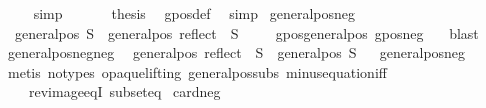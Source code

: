 \begin{isabellebody}
\ {}\ {}\ \isamarkupfalse%
\ simp\isanewline
\ \ \isakeywordONE{{\isacharbraceright}{\kern0pt}}\isamarkupfalse%
\isanewline
\ \ \isamarkupfalse%
\ {\isacharquery}{\kern0pt}thesis\ \isamarkupfalse%
\ gpos{\isacharunderscore}{\kern0pt}def\ \isamarkupfalse%
\ simp\isanewline
{}\isamarkupfalse%
%
\endisatagproof
{\isafoldproof}%
%
\isadelimproof
\isanewline
%
\endisadelimproof
\isanewline
{}\isamarkupfalse%
\ general{\isacharunderscore}{\kern0pt}pos{\isacharunderscore}{\kern0pt}neg{\isacharcolon}{\kern0pt}\isanewline
\ \ {\isachardoublequoteopen}general{\isacharunderscore}{\kern0pt}pos\ S\ {\isasymlongrightarrow}\ general{\isacharunderscore}{\kern0pt}pos\ {\isacharparenleft}{\kern0pt}reflect\ {\isacharbackquote}{\kern0pt}\ S{\isacharparenright}{\kern0pt}{\isachardoublequoteclose}\ \isanewline
%
\isadelimproof
\ \ %
\endisadelimproof
%
\isatagproof
{}\isamarkupfalse%
\ gpos{\isacharunderscore}{\kern0pt}generalpos\ gpos{\isacharunderscore}{\kern0pt}neg\ \ \isamarkupfalse%
\ blast%
\endisatagproof
{\isafoldproof}%
%
\isadelimproof
\isanewline
%
\endisadelimproof
\isanewline
{}\isamarkupfalse%
\ general{\isacharunderscore}{\kern0pt}pos{\isacharunderscore}{\kern0pt}neg{\isacharunderscore}{\kern0pt}neg{\isacharcolon}{\kern0pt}\isanewline
\ \ {\isachardoublequoteopen}general{\isacharunderscore}{\kern0pt}pos\ {\isacharparenleft}{\kern0pt}reflect\ {\isacharbackquote}{\kern0pt}\ S{\isacharparenright}{\kern0pt}\ {\isasymlongrightarrow}\ general{\isacharunderscore}{\kern0pt}pos\ S{\isachardoublequoteclose}%
\isadelimproof
\ %
\endisadelimproof
%
\isatagproof
{}\isamarkupfalse%
\ general{\isacharunderscore}{\kern0pt}pos{\isacharunderscore}{\kern0pt}neg\ \ \isanewline
\ \ \isamarkupfalse%
\ {\isacharparenleft}{\kern0pt}metis\ {\isacharparenleft}{\kern0pt}no{\isacharunderscore}{\kern0pt}types{\isacharcomma}{\kern0pt}\ opaque{\isacharunderscore}{\kern0pt}lifting{\isacharparenright}{\kern0pt}\ general{\isacharunderscore}{\kern0pt}pos{\isacharunderscore}{\kern0pt}subs\ minus{\isacharunderscore}{\kern0pt}equation{\isacharunderscore}{\kern0pt}iff\isanewline
\ \ \ \ rev{\isacharunderscore}{\kern0pt}image{\isacharunderscore}{\kern0pt}eqI\ subset{\isacharunderscore}{\kern0pt}eq{\isacharparenright}{\kern0pt}%
\endisatagproof
{\isafoldproof}%
%
\isadelimproof
%
\endisadelimproof
\isanewline
\isanewline
{}\isamarkupfalse%
\ card{\isacharunderscore}{\kern0pt}neg{\isacharcolon}{\kern0pt}\isanewline

\end{isabellebody}
